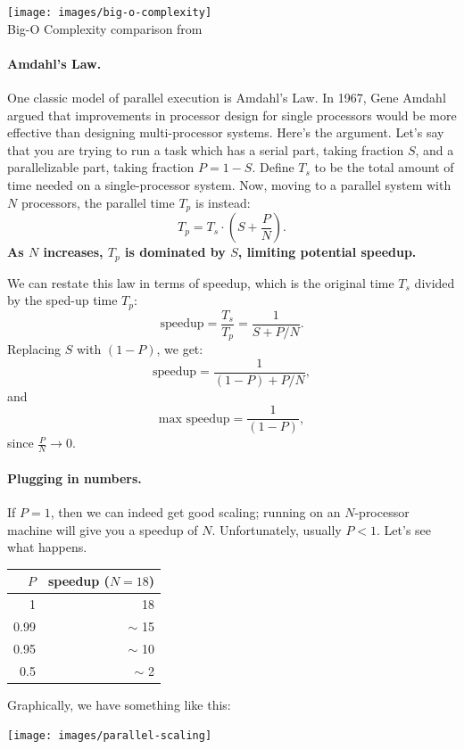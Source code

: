 \documentclass[a4paper]{report}
\begin{document}
\begin{center}
	\texttt{[image: images/big-o-complexity]}\\
	Big-O Complexity comparison from ~\cite{bigocheatsheet}
\end{center}


\paragraph{Amdahl's Law.} One classic model of parallel execution
is Amdahl's Law. In 1967, Gene Amdahl argued that improvements in
processor design for single processors would be more effective than
designing multi-processor systems. Here's the argument. Let's say that
you are trying to run a task which has a serial part, taking fraction 
$S$, and a parallelizable part, taking fraction $P = 1-S$. Define $T_s$
to be the total 
amount of time needed on a single-processor system.
Now, moving to a parallel system with $N$ processors, the parallel
time $T_p$ is instead:
\[ T_p = T_s \cdot (S + \frac{P}{N}). \]
{\bf As $N$ increases, $T_p$ is dominated by $S$, limiting potential
speedup.}

We can restate this law in terms of speedup, which is the 
original time $T_s$ divided by the sped-up time $T_p$:
\[ \mbox{speedup} = \frac{T_s}{T_p} = \frac{1}{S+P/N}. \]
Replacing $S$ with $(1-P)$, we get:
\[ \mbox{speedup} = \frac{1}{(1-P)+P/N}, \]
and
\[ \mbox{max speedup} = \frac{1}{(1-P)}, \]
since $\frac{P}{N} \rightarrow 0$.

\paragraph{Plugging in numbers.} If $P = 1$, then we can indeed get good
scaling; running on an $N$-processor machine will give you a speedup
of $N$. Unfortunately, usually $P < 1$.  Let's see what happens.

\begin{center}
\begin{tabular}{r|r}
$P$ & speedup ($N=18$) \\ \hline
1 & 18 \\
0.99 & $\sim$ 15 \\
0.95 & $\sim$ 10 \\
0.5 & $\sim$ 2
\end{tabular}
\end{center}
Graphically, we have something like this:
\begin{center}
  \texttt{[image: images/parallel-scaling]}
\end{center}
\end{document}
